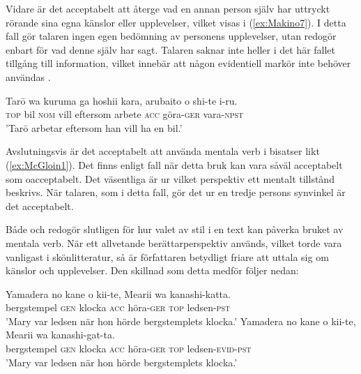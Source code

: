 \documentclass[12pt,a4paper]{article}
\begin{document}
\noindent
Vidare är det acceptabelt att återge vad en annan person själv har uttryckt rörande sina egna känslor eller upplevelser, vilket visas i (\ref{ex:Makino7}). I detta fall gör talaren ingen egen bedömning av personens upplevelser, utan redogör enbart för vad denne själv har sagt. Talaren saknar inte heller i det här fallet tillgång till information, vilket innebär att någon evidentiell markör inte behöver användas \autocite{makino1986,mcgloin1989}.

\begin{exe}
\ex
\label{ex:McGloin1}
\gll Tar\=o wa kuruma ga hoshii kara,  arubaito o shi-te i-ru. \\
     {} \textsc{top} bil \textsc{nom} vill eftersom arbete \textsc{acc} göra-\textsc{ger} vara-\textsc{npst} \\
\glt 'Tar\=o arbetar eftersom han vill ha en bil.'
\hfill \autocite[anpassat från][121]{mcgloin1989}
\end{exe}

\noindent
Avslutningsvis är det acceptabelt att använda mentala verb i bisatser likt (\ref{ex:McGloin1}). Det finns enligt \textcite{mcgloin1989} fall när detta bruk kan vara såväl acceptabelt som oacceptabelt. Det väsentliga är ur vilket perspektiv ett mentalt tillstånd beskrivs. När talaren, som i detta fall, gör det ur en tredje persons synvinkel är det acceptabelt.

Både \textcite{kamio1995} och \textcite{kuroda1973} redogör slutligen för hur valet av stil i en text kan påverka bruket av mentala verb. När ett allvetande berättarperspektiv används, vilket torde vara vanligast i skönlitteratur, så är författaren betydligt friare att uttala sig om känslor och upplevelser. Den skillnad som detta medför följer nedan:

\begin{exe}
\ex
\begin{xlist}
\ex
\label{ex:Kuroda3a}
\gll Yamadera no kane o kii-te, Mearii wa kanashi-katta. \\
     bergstempel \textsc{gen} klocka \textsc{acc} höra-\textsc{ger} {} \textsc{top} ledsen-\textsc{pst} \\
\glt 'Mary var ledsen när hon hörde bergstemplets klocka.'
\ex
\label{ex:Kuroda3b}
\gll Yamadera no kane o kii-te, Mearii wa kanashi-gat-ta. \\
     bergstempel \textsc{gen} klocka \textsc{acc} höra-\textsc{ger} {} \textsc{top} ledsen-\textsc{evid}-\textsc{pst} \\
\glt 'Mary var ledsen när hon hörde bergstemplets klocka.'
\flushright \autocite[anpassat från][384]{kuroda1973}
\end{xlist}
\end{exe}
\end{document}
